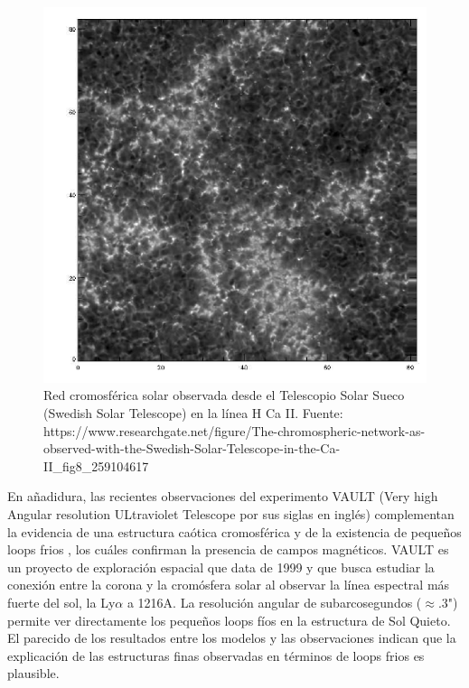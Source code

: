 \documentclass[9pt]{book}
\begin{document}
\begin{figure}[h]

\centering
\includegraphics[scale=0.5]{chromospheric_network2}
\caption{ Red cromosf\'erica solar observada desde el Telescopio Solar Sueco (Swedish Solar Telescope) en la l\'inea H Ca II.
\newline Fuente: https://www.researchgate.net/figure/The-chromospheric-network-as-observed-with-the-Swedish-Solar-Telescope-in-the-Ca-II\_fig8\_259104617}
\label{chromospheric_network2}
\end{figure}


En a\~nadidura, las recientes observaciones del experimento VAULT (Very high Angular resolution ULtraviolet Telescope por sus siglas en ingl\'es) complementan la evidencia de una estructura ca\'otica cromosf\'erica y de la existencia de peque\~nos loops frios \cite{VAULT1}, los cu\'ales confirman la presencia de campos magn\'eticos.
VAULT es un proyecto de exploraci\'on espacial que data de 1999 y que busca estudiar la conexi\'on entre la corona y la crom\'osfera solar al observar la l\'inea espectral m\'as fuerte del sol, la Ly$\alpha$ a 1216A.
La resoluci\'on angular de subarcosegundos ($\approx$.3") permite ver directamente los peque\~nos loops f\'ios en la estructura de Sol Quieto. El parecido de los resultados entre los modelos y las observaciones indican que la explicaci\'on de las estructuras finas observadas en t\'erminos de loops frios es plausible.
\end{document}
